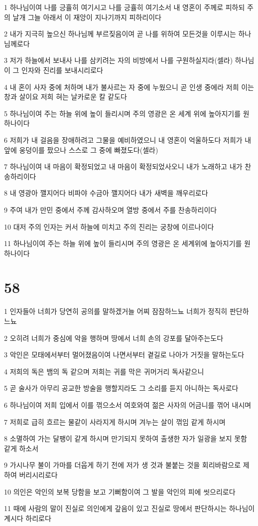 \par 1 하나님이여 나를 긍휼히 여기시고 나를 긍휼히 여기소서 내 영혼이 주께로 피하되 주의 날개 그늘 아래서 이 재앙이 지나기까지 피하리이다
\par 2 내가 지극히 높으신 하나님께 부르짖음이여 곧 나를 위하여 모든것을 이루시는 하나님께로다
\par 3 저가 하늘에서 보내사 나를 삼키려는 자의 비방에서 나를 구원하실지라(셀라) 하나님이 그 인자와 진리를 보내시리로다
\par 4 내 혼이 사자 중에 처하며 내가 불사르는 자 중에 누웠으니 곧 인생 중에라 저희 이는 창과 살이요 저희 혀는 날카로운 칼 같도다
\par 5 하나님이여 주는 하늘 위에 높이 들리시며 주의 영광은 온 세계 위에 높아지기를 원하나이다
\par 6 저희가 내 걸음을 장애하려고 그물을 예비하였으니 내 영혼이 억울하도다 저희가 내 앞에 웅덩이를 팠으나 스스로 그 중에 빠졌도다(셀라)
\par 7 하나님이여 내 마음이 확정되었고 내 마음이 확정되었사오니 내가 노래하고 내가 찬송하리이다
\par 8 내 영광아 깰지어다 비파야 수금아 깰지어다 내가 새벽을 깨우리로다
\par 9 주여 내가 만민 중에서 주께 감사하오며 열방 중에서 주를 찬송하리이다
\par 10 대저 주의 인자는 커서 하늘에 미치고 주의 진리는 궁창에 이르나이다
\par 11 하나님이여 주는 하늘 위에 높이 들리시며 주의 영광은 온 세계위에 높아지기를 원하나이다

\chapter{58}

\par 1 인자들아 너희가 당연히 공의를 말하겠거늘 어찌 잠잠하느뇨 너희가 정직히 판단하느뇨
\par 2 오히려 너희가 중심에 악을 행하며 땅에서 너희 손의 강포를 달아주는도다
\par 3 악인은 모태에서부터 멀어졌음이여 나면서부터 곁길로 나아가 거짓을 말하는도다
\par 4 저희의 독은 뱀의 독 같으며 저희는 귀를 막은 귀머거리 독사같으니
\par 5 곧 술사가 아무리 공교한 방술을 행할지라도 그 소리를 듣지 아니하는 독사로다
\par 6 하나님이여 저희 입에서 이를 꺾으소서 여호와여 젊은 사자의 어금니를 꺾어 내시며
\par 7 저희로 급히 흐르는 물같이 사라지게 하시며 겨누는 살이 꺾임 같게 하시며
\par 8 소멸하여 가는 달팽이 같게 하시며 만기되지 못하여 출생한 자가 일광을 보지 못함 같게 하소서
\par 9 가시나무 불이 가마를 더웁게 하기 전에 저가 생 것과 불붙는 것을 회리바람으로 제하여 버리시리로다
\par 10 의인은 악인의 보복 당함을 보고 기뻐함이여 그 발을 악인의 피에 씻으리로다
\par 11 때에 사람의 말이 진실로 의인에게 갚음이 있고 진실로 땅에서 판단하시는 하나님이 계시다 하리로다

